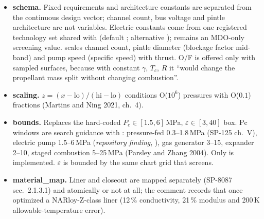 \begin{itemize}
\item \textbf{schema.} Fixed requirements and architecture constants are separated from the continuous design vector; channel count, bus voltage and pintle architecture are not variables. Electric constants come from one registered technology set shared with  (default ; alternative );  remains an MDO-only screening value.  scales channel count, pintle diameter (blockage factor mid-band) and pump speed (specific speed) with thrust. O/F is offered only with sampled surfaces, because with constant $\gamma$, $T_c$, $R$ it ``would change the propellant mass split without changing combustion''.
\item \textbf{scaling.} $z=(x-\mathrm{lo})/(\mathrm{hi}-\mathrm{lo})$ conditions O($10^6$) pressures with O($0.1$) fractions (Martins and Ning 2021, ch.~4).
\item \textbf{bounds.} Replaces the hard-coded $P_c\in[1.5,6]$\,MPa, $\varepsilon\in[3,40]$ box. Pc windows are search guidance with : pressure-fed 0.3--1.8\,MPa (SP-125 ch.~V), electric pump 1.5--6\,MPa (\emph{repository finding}, ), gas generator 3--15, expander 2--10, staged combustion 5--25\,MPa (Parsley and Zhang 2004). Only  is implemented. $\varepsilon$ is bounded by the same chart grid that  screens.
\item \textbf{material\_map.} Liner and closeout are mapped separately (SP-8087 sec.~2.1.3.1) and atomically or not at all; the comment records that  once optimized a NARloy-Z-class liner (12\,\% conductivity, 21\,\% modulus and 200\,K allowable-temperature error).
\end{itemize}

